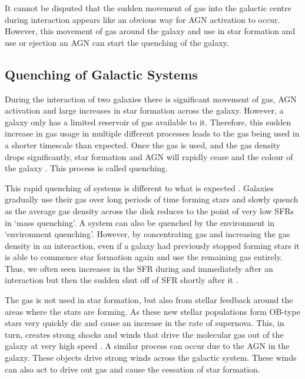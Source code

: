 It cannot be disputed that the sudden movement of gas into the galactic centre during interaction appears like an obvious way for AGN activation to occur. However, this movement of gas around the galaxy and use in star formation and use or ejection \DIFdelbegin {}\DIFdelend \DIFaddbegin {}\DIFaddend an AGN can start the quenching of the galaxy. 

\subsection{Quenching of Galactic Systems}
\noindent During the interaction of two galaxies there is significant movement of gas, AGN activation and large increases in star formation across the galaxy. However, a galaxy only has a limited reservoir of gas available to it. Therefore, this sudden increase in gas usage in multiple different processes leads to the gas being used in a shorter timescale than expected. Once the gas is used, and the gas density drops significantly, star formation and AGN will rapidly cease and the colour of the galaxy \DIFaddbegin {}\DIFaddend . This process is called quenching.

This rapid quenching of systems is different to what is expected \DIFdelbegin {}\DIFdelend \DIFaddbegin {}\DIFaddend . Galaxies gradually use their gas over long periods of time forming stars and slowly quench as the average gas density across the disk reduces to the point of very low SFRs \citep{2010ApJ...721..193P} in `mass quenching'. A system can also be quenched by the environment in `environment quenching'. However, by concentrating gas and increasing the gas density in an interaction, even if a galaxy had previously stopped forming stars it is able to commence star formation again and use the remaining gas entirely. Thus, we often seen increases in the SFR during and immediately after an interaction but then the sudden shut off of SFR shortly after it \citep{2022MNRAS.517L..92E}. 

The \DIFdelbegin {}\DIFdelend gas is not \DIFdelbegin {}\DIFdelend \DIFaddbegin {}\DIFaddend used in star formation, but also from stellar feedback around the areas where the stars are forming. As these new stellar populations form OB-type stars very quickly die and cause an increase in the rate of supernova. This, in turn, creates strong shocks and winds that drive the molecular gas out of the galaxy at very high speed \citep{2013Natur.499..450B, 2018ApJ...864L...1G}. A similar process can occur due to the AGN in the galaxy. These objects drive strong winds across the galactic system. These winds can also act to drive out gas \citep{2014A&A...562A..21C, 2016Natur.533..504C, 2018MNRAS.480.3993B} and cause the cessation of star formation.

